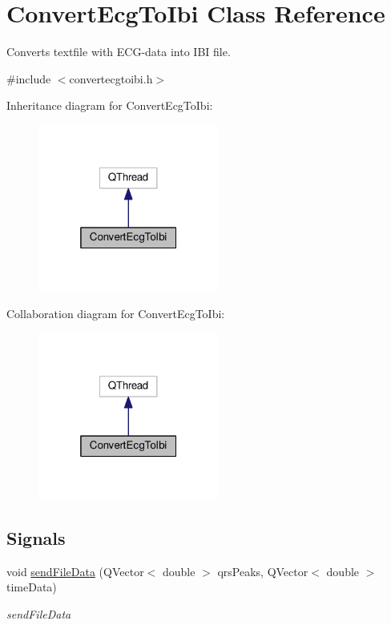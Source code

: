 \hypertarget{classConvertEcgToIbi}{}\section{Convert\+Ecg\+To\+Ibi Class Reference}
\label{classConvertEcgToIbi}


Converts textfile with E\+C\+G-\/data into I\+BI file.  




{\ttfamily \#include $<$convertecgtoibi.\+h$>$}



Inheritance diagram for Convert\+Ecg\+To\+Ibi\+:\nopagebreak
\begin{figure}[H]
\begin{center}
\leavevmode
\includegraphics[width=169pt]{classConvertEcgToIbi__inherit__graph}
\end{center}
\end{figure}


Collaboration diagram for Convert\+Ecg\+To\+Ibi\+:\nopagebreak
\begin{figure}[H]
\begin{center}
\leavevmode
\includegraphics[width=169pt]{classConvertEcgToIbi__coll__graph}
\end{center}
\end{figure}
\subsection*{Signals}
\begin{DoxyCompactItemize}
\item 
void \hyperlink{classConvertEcgToIbi_a34d6d61a81e88116c65a2ba9198b7f1c}{send\+File\+Data} (Q\+Vector$<$ double $>$ qrs\+Peaks, Q\+Vector$<$ double $>$ time\+Data)
\begin{DoxyCompactList}\small\item\em send\+File\+Data \end{DoxyCompactList}\end{DoxyCompactItemize}
